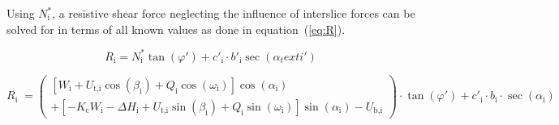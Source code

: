 \documentclass[12pt]{article}
\begin{document}
\noindent
Using $N^*_\text{i}$, a resistive shear force neglecting the influence
of interslice forces can be solved for in terms of all known values as
done in equation~(\ref{eq:R}).

\begin{equation*}
R_\text{i} = N^*_\text{i} \tan\left(\varphi'\right) + c'_\text{i}
\cdot b'_\text{i} \sec\left(\alpha_text{i}'\right)
\end{equation*}

\begin{equation}\label{eq:R}   R_{\text{i}} \; =
  \left( \begin{array}{l} \left[ W_{\text{i}} + U_{\text{t,i}}
      \cos\left(\beta_{\text{i}}\right) + Q_{\text{i}}
      \cos\left(\omega_{\text{i}}\right) \right]
    \cos\left(\alpha_{\text{i}}\right) \\ + \left[ - K_{\text{c}}
      W_{\text{i}} - \Delta H_{\text{i}} + U_{\text{t,i}}
      \sin\left(\beta_{\text{i}}\right) + Q_{\text{i}}
      \sin\left(\omega_{\text{i}}\right) \right]
    \sin\left(\alpha_{\text{i}}\right) - U_{\text{b,i}} \end{array}
  \right) \cdot \tan\left(\varphi'\right) + c'_{\text{i}} \cdot
  b_{\text{i}} \cdot \sec\left(\alpha_{\text{i}}\right)
 \end{equation}

~\newline

\end{document}

